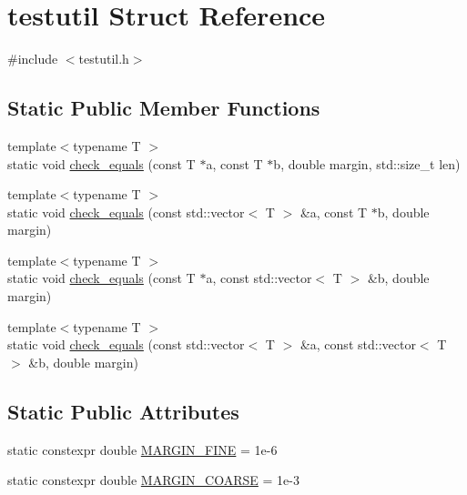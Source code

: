 \hypertarget{structtestutil}{}\section{testutil Struct Reference}
\label{structtestutil}


{\ttfamily \#include $<$testutil.\+h$>$}

\subsection*{Static Public Member Functions}
\begin{DoxyCompactItemize}
\item 
{\footnotesize template$<$typename T $>$ }\\static void \hyperlink{structtestutil_a5b49bfffa8e323fbac9b0a82f243156e}{check\+\_\+equals} (const T $\ast$a, const T $\ast$b, double margin, std\+::size\+\_\+t len)
\item 
{\footnotesize template$<$typename T $>$ }\\static void \hyperlink{structtestutil_aacb9c6f68af8f3217e590ed3b82d1a4f}{check\+\_\+equals} (const std\+::vector$<$ T $>$ \&a, const T $\ast$b, double margin)
\item 
{\footnotesize template$<$typename T $>$ }\\static void \hyperlink{structtestutil_ac6df0159fd0afd6752f5fb21c579475c}{check\+\_\+equals} (const T $\ast$a, const std\+::vector$<$ T $>$ \&b, double margin)
\item 
{\footnotesize template$<$typename T $>$ }\\static void \hyperlink{structtestutil_a4a2928638dfe295138a445d142ea83de}{check\+\_\+equals} (const std\+::vector$<$ T $>$ \&a, const std\+::vector$<$ T $>$ \&b, double margin)
\end{DoxyCompactItemize}
\subsection*{Static Public Attributes}
\begin{DoxyCompactItemize}
\item 
static constexpr double \hyperlink{structtestutil_a7a42df59c058fb72e784d1e4420ff392}{M\+A\+R\+G\+I\+N\+\_\+\+F\+I\+NE} = 1e-\/6
\item 
static constexpr double \hyperlink{structtestutil_a9fc0c46780b519e3e09e38337058ae3d}{M\+A\+R\+G\+I\+N\+\_\+\+C\+O\+A\+R\+SE} = 1e-\/3
\end{DoxyCompactItemize}


